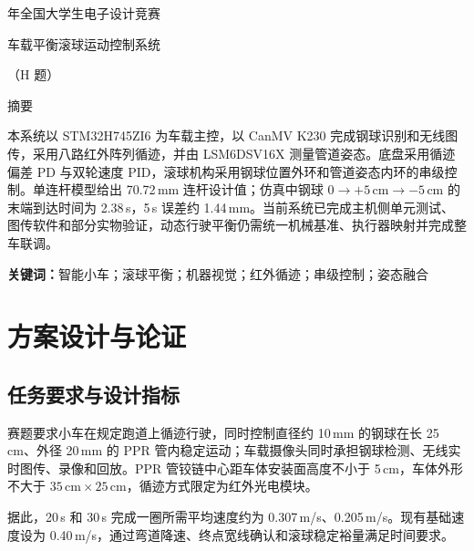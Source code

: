 \documentclass[UTF8,a4paper,12pt]{ctexart}
\begin{document}
\fontsize{12pt}{18pt}\selectfont
{}
\begin{center}
  { 年全国大学生电子设计竞赛\par}
  \vspace{0.35em}
  {\heiti 车载平衡滚球运动控制系统\par}
  \vspace{0.15em}
  {\heiti （H 题）\par}
  \vspace{0.8em}
  {\Large\heiti 摘\quad 要\par}
\end{center}

本系统以 STM32H745ZI6 为车载主控，以 CanMV K230 完成钢球识别和无线图传，采用八路红外阵列循迹，并由 LSM6DSV16X 测量管道姿态。底盘采用循迹偏差 PD 与双轮速度 PID，滚球机构采用钢球位置外环和管道姿态内环的串级控制。单连杆模型给出 70.72\,mm 连杆设计值；仿真中钢球 $0\rightarrow+5\,\mathrm{cm}\rightarrow-5\,\mathrm{cm}$ 的末端到达时间为 2.38\,s，5\,s 误差约 1.44\,mm。当前系统已完成主机侧单元测试、图传软件和部分实物验证，动态行驶平衡仍需统一机械基准、执行器映射并完成整车联调。

\noindent\textbf{关键词：}智能小车；滚球平衡；机器视觉；红外循迹；串级控制；姿态融合

\clearpage
\begingroup
  \fontsize{10pt}{14pt}\selectfont
  \tableofcontents
\endgroup
\clearpage

\section{方案设计与论证}

\subsection{任务要求与设计指标}

赛题要求小车在规定跑道上循迹行驶，同时控制直径约 10\,mm 的钢球在长 25\,cm、外径 20\,mm 的 PPR 管内稳定运动；车载摄像头同时承担钢球检测、无线实时图传、录像和回放。PPR 管铰链中心距车体安装面高度不小于 5\,cm，车体外形不大于 $35\,\mathrm{cm}\times25\,\mathrm{cm}$，循迹方式限定为红外光电模块。

据此，20\,s 和 30\,s 完成一圈所需平均速度约为 0.307\,m/s、0.205\,m/s。现有基础速度设为 0.40\,m/s，通过弯道降速、终点宽线确认和滚球稳定裕量满足时间要求。
\end{document}
